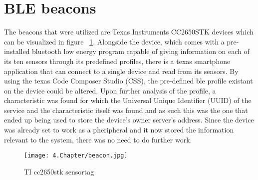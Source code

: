 \section{ \ac{BLE} beacons}
\label{sec:beacon}


The beacons that were utilized are Texas Instruments CC2650STK devices which can be visualized in figure ~\ref{fig:beacon}. Alongside the device, which comes with a pre-installed bluetooth low energy program capable of giving information on each of its ten sensors through its predefined profiles, there is a texas smartphone application that can connect to a single device and read from its sensors. By using the texas Code Composer Studio (CSS), the pre-defined ble profile existant on the device could be altered. Upon further analysis of the profile, a characteristic was found for which the Universal Unique Identifier (UUID) of the service and the characteristic itself was found and as such this was the one that ended up being used to store the device's owner server's address. Since the device was already set to work as a pheripheral and it now stored the information relevant to the system, there was no need to do further work.

\begin{figure}
	\centering
		\texttt{[image: 4.Chapter/beacon.jpg]}
	\caption[TI cc2650stk sensortag]{TI cc2650stk sensortag}
	\label{fig:beacon}
\end{figure}
